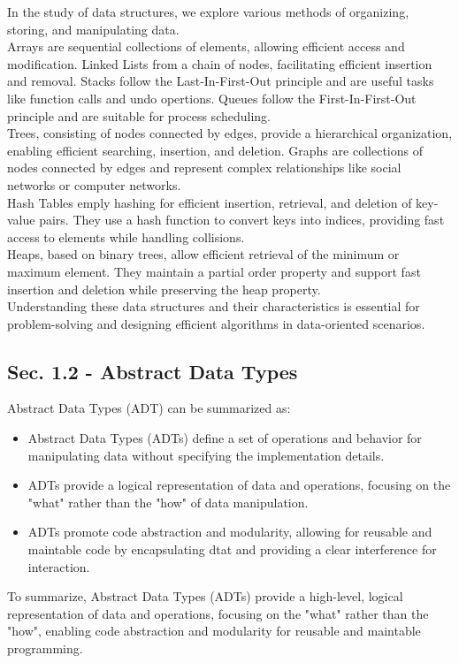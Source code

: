 In the study of data structures, we explore various methods of organizing, storing, and manipulating data. \\

\noindent Arrays are sequential collections of elements, allowing efficient access and modification. Linked Lists from a chain of nodes, facilitating
efficient insertion and removal. Stacks follow the Last-In-First-Out principle and are useful tasks like function calls and undo opertions.
Queues follow the First-In-First-Out principle and are suitable for process scheduling. \\

\noindent Trees, consisting of nodes connected by edges, provide a hierarchical organization, enabling efficient searching, insertion, and deletion.
Graphs are collections of nodes connected by edges and represent complex relationships like social networks or computer networks. \\

\noindent Hash Tables emply hashing for efficient insertion, retrieval, and deletion of key-value pairs. They use a hash function to convert keys into
indices, providing fast access to elements while handling collisions. \\

\noindent Heaps, based on binary trees, allow efficient retrieval of the minimum or maximum element. They maintain a partial order property and support
fast insertion and deletion while preserving the heap property. \\

\noindent Understanding these data structures and their characteristics is essential for problem-solving and designing efficient algorithms in data-oriented
scenarios. \\

\subsection{Sec. 1.2 - Abstract Data Types}
\noindent Abstract Data Types (ADT) can be summarized as:
\begin{itemize}
    \item Abstract Data Types (ADTs) define a set of operations and behavior for manipulating data without specifying the implementation details.
    \item ADTs provide a logical representation of data and operations, focusing on the "what" rather than the "how" of data manipulation.
    \item ADTs promote code abstraction and modularity, allowing for reusable and maintable code by encapsulating dtat and providing a clear interference for interaction.
\end{itemize}
To summarize, Abstract Data Types (ADTs) provide a high-level, logical representation of data and operations, focusing on the "what" rather than the "how", enabling
code abstraction and modularity for reusable and maintable programming.

